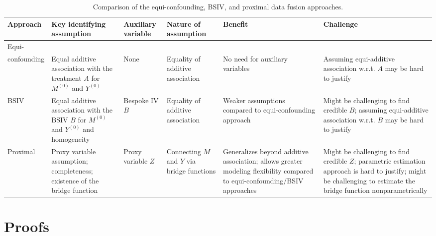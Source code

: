 \documentclass[10pt]{article}
\begin{document}
\begingroup
\setlength{\tabcolsep}{6pt}        %
\setlength{\aboverulesep}{10pt}
\setlength{\belowrulesep}{10pt}
\renewcommand{\arraystretch}{1.1}
{\fontsize{9}{10}\selectfont       %
\begin{table}\scriptsize
\centering
\caption{Comparison of the equi-confounding, BSIV, and proximal data fusion approaches.}
\begin{tabularx}{\textwidth}{@{} l Y Y Y Y Y @{}}
\toprule
\textbf{Approach} & \textbf{Key identifying assumption} & \textbf{Auxiliary variable} &
\textbf{Nature of assumption} & \textbf{Benefit} & \textbf{Challenge} \\
\midrule
Equi-\\confounding &
Equal additive association with the treatment \(A\) for \(M^{(0)}\) and \(Y^{(0)}\)&
None&
Equality of additive association&
No need for auxiliary variables&
Assuming equi-additive association w.r.t. $A$ may be hard to justify\\
\addlinespace\midrule
BSIV   &
Equal additive association with the BSIV \(B\) for \(M^{(0)}\) and \(Y^{(0)}\) and homogeneity&
Bespoke IV \(B\) &
Equality of additive association&
Weaker assumptions compared to equi-confounding approach&
Might be challenging to find credible $B$;
assuming equi-additive association w.r.t. $B$ may be hard to justify\\
\addlinespace\midrule
Proximal   &
Proxy variable assumption; completeness; existence of the bridge function&
Proxy variable \(Z\)&
Connecting \(M\) and \(Y\) via bridge functions&
Generalizes beyond additive association; allows greater modeling flexibility compared to equi-confounding/BSIV approaches&
Might be challenging to find credible $Z$;
parametric estimation approach is hard to justify;
might be challenging to estimate the bridge function nonparametrically\\
\bottomrule
\end{tabularx}
\end{table}
} %
\endgroup


\newpage
\section{Proofs}
\end{document}
